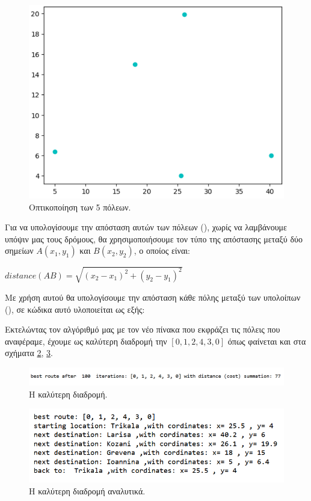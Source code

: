 \begin{figure}
    \centering
    \includegraphics[scale=0.45]{2947_thesis/pictures/map1.png} 
    \caption{Οπτικοποίηση των 5 πόλεων.}
    \label{map1}
\end{figure}

Για να υπολογίσουμε την απόσταση αυτών των πόλεων (), χωρίς να λαμβάνουμε υπόψιν μας τους δρόμους, θα χρησιμοποιήσουμε τον τύπο της απόστασης μεταξύ δύο σημείων $A(x_1,y_1)$ και $B(x_2,y_2)$, ο οποίος είναι: 
\begin{center}
   $distance(AB) = \sqrt{(x_2-x_1)^2+(y_2-y_1)^2}$ 
\end{center}
Με χρήση αυτού θα υπολογίσουμε την απόσταση κάθε πόλης μεταξύ των υπολοίπων (), σε κώδικα αυτό υλοποιείται ως εξής:


Εκτελώντας τον αλγόριθμό μας με τον νέο πίνακα  που εκφράζει τις πόλεις που αναφέραμε, έχουμε ως καλύτερη διαδρομή την $[0, 1, 2, 4, 3, 0]$ όπως φαίνεται και στα σχήματα \ref{best_route}, \ref{best_route_explained}.

\begin{figure}
    \centering
    \includegraphics[scale=0.58]{2947_thesis/pictures/best_route.png} 
    \caption{Η καλύτερη διαδρομή.}
    \label{best_route}
\end{figure}
\begin{figure}
    \centering
    \includegraphics[scale=0.80]{2947_thesis/pictures/best_route_explained.png} 
    \caption{Η καλύτερη διαδρομή αναλυτικά.}
    \label{best_route_explained}
\end{figure}

